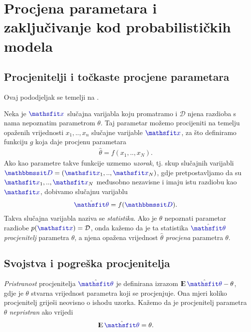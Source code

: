 \documentclass[utf8, diplomski, lmodern]{fer}
\begin{document}

\cite{Murray:2005:NEBOR} %


\section{Procjena parametara i zaključivanje kod probabilističkih modela}

\subsection{Procjenitelji i točkaste procjene parametara}

Ovaj pododjeljak se temelji na \cite{Elezovic:2007:VSSV}.

Neka je $\rvar x$ slučajna varijabla koju promatramo i $\mathcal D$ njena razdioba s nama nepoznatim parametrom $\theta$. Taj parametar možemo procijeniti na temelju opaženih vrijednosti $x_1,..,x_n$ slučajne varijable $\rvar x$, za što definiramo funkciju $g$ koja daje procjenu parametara
\begin{align}
\hat{\theta}=f(x_1,..,x_N) \text{.}
\end{align}
Ako kao parametre takve funkcije uzmemo \emph{uzorak}, tj. skup slučajnih varijabli $\rset D=\del{\rvar x_1,..,\rvar x_N}$, gdje pretpostavljamo da su $\rvar x_1,..,\rvar x_N$ međusobno nezavisne i imaju istu razdiobu kao $\rvar x$, dobivamo slučajnu varijablu
\begin{align}
\hat{\rvar\theta}=f(\rset D) \text{.}
\end{align}
Takva slučajna varijabla naziva se \emph{statistika}. Ako je $\theta$ nepoznati parametar razdiobe $p(\rvar x)=\mathcal{D}$, onda kažemo da je ta statistika $\hat{\rvar\theta}$ \emph{procjenitelj} parametra $\theta$, a njena opažena vrijednost $\hat{\theta}$ \emph{procjena} parametra $\theta$.

\subsection{Svojstva i pogreška procjenitelja}

\emph{Pristranost} procjenitelja $\hat{\rvar\theta}$ je definirana izrazom $\E\hat{\rvar\theta} - \theta$, gdje je $\theta$ stvarna vrijednost parametra koji se procjenjuje. Ona mjeri koliko procjenitelj griješi neovisno o ishodu uzorka. Kažemo da je procjenitelj parametra $\theta$ \emph{nepristran} ako vrijedi
\begin{align}
\E\hat{\rvar\theta} = \theta \text{.}
\end{align}
\end{document}
